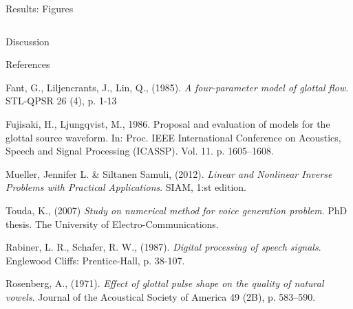 \documentclass[final]{beamer}
\begin{document}
\begin{frame}[t]
\begin{columns}[t]
\begin{column}{.465\textwidth}
\begin{block}{Results: Figures}
\begin{columns}
\end{columns}


\end{block}


\begin{block}{Discussion}



\end{block}


\begin{block}{References}

\begin{scriptsize}


\begin{thebibliography}{9}

    Fant, G., Liljencrants, J., Lin, Q., (1985).
    \emph{A four-parameter model of glottal flow}.
    STL-QPSR 26 (4), p. 1-13
    
    Fujisaki, H., Ljungqvist, M., 1986.
    Proposal and evaluation of models for the glottal source waveform.
    In: Proc. IEEE International Conference on Acoustics, Speech and Signal Processing (ICASSP). Vol. 11. p. 1605–1608.
    
	Mueller, Jennifer L. \& Siltanen Samuli, (2012).
	\emph{Linear and Nonlinear Inverse Problems with Practical Applications}.
	SIAM, 1:st edition.
	
    Touda, K., (2007)
    \emph{Study on numerical method for voice generation problem}.
    PhD thesis.
    The University of Electro-Communications.
    
    Rabiner, L. R., Schafer, R. W., (1987).
    \emph{Digital processing of speech signals}.
    Englewood Cliffs: Prentice-Hall, p. 38-107.

    Rosenberg, A., (1971).
    \emph{Effect of glottal pulse shape on the quality of natural vowels}.
    Journal of the Acoustical Society of America 49 (2B), p. 583–590.

\end{thebibliography}


\end{scriptsize}
\end{block}
\end{column}
\end{columns}
\end{frame}
\end{document}
